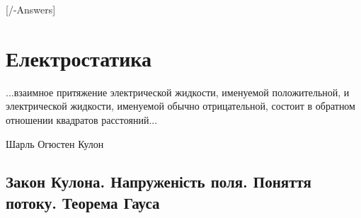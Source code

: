 
[\currfilebase/\currfilebase-Answers]
\chapter{Електростатика}\label{\currfilebase}
\epigraph{\Annabelle  ...взаимное притяжение электрической жидкости, именуемой положительной, и электрической жидкости, именуемой обычно отрицательной, состоит в обратном отношении квадратов расстояний...
}{Шарль Огюстен Кулон}


\section{Закон Кулона. Напруженість поля. Поняття потоку. Теорема Гауса}

